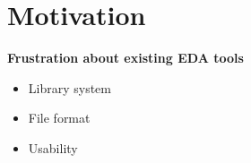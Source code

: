\section{Motivation}

\begin{frame}{\secname}
  \textbf{Frustration about existing EDA tools}
  \begin{itemize}
    \item Library system
    \item File format
    \item Usability
  \end{itemize}
\end{frame}